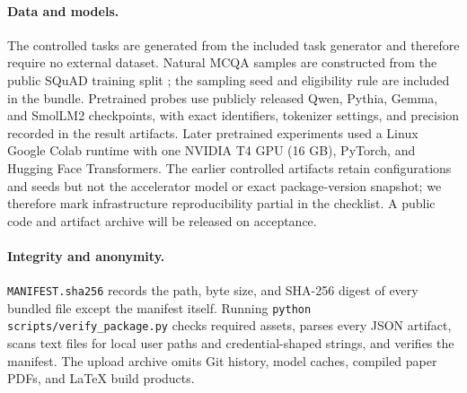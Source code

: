 \documentclass[letterpaper]{article} %
\begin{document}
\paragraph{Data and models.}
The controlled tasks are generated from the included task generator and therefore require no external dataset.
Natural MCQA samples are constructed from the public SQuAD training split \citep{rajpurkar2016squad}; the
sampling seed and eligibility rule are included in the bundle. Pretrained probes use publicly released Qwen,
Pythia, Gemma, and SmolLM2 checkpoints, with exact identifiers, tokenizer settings, and precision recorded in
the result artifacts. Later pretrained experiments used a Linux Google Colab runtime with one NVIDIA T4 GPU
(16 GB), PyTorch, and Hugging Face Transformers. The earlier controlled artifacts retain configurations and
seeds but not the accelerator model or exact package-version snapshot; we therefore mark infrastructure
reproducibility partial in the checklist. A public code and artifact archive will be released on acceptance.

\paragraph{Integrity and anonymity.}
\texttt{MANIFEST.sha256} records the path, byte size, and SHA-256 digest of every bundled file except the
manifest itself. Running \texttt{python scripts/verify\_package.py} checks required assets, parses every JSON
artifact, scans text files for local user paths and credential-shaped strings, and verifies the manifest.
The upload archive omits Git history, model caches, compiled paper PDFs, and LaTeX build products.


\end{document}
